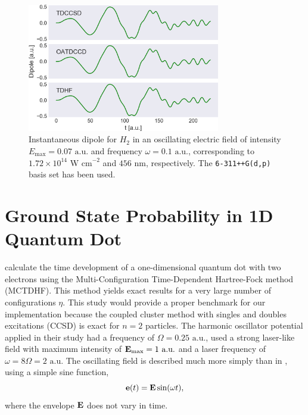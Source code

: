 \begin{figure}
    \centering
    \includegraphics[width=0.75\textwidth]{results/figures/li_compare.png}
    \caption{Instantaneous dipole for $H_2$ in an oscillating electric field
        of intensity $E_\text{max} = 0.07 \text{ a.u.}$ 
        and frequency $\omega=0.1 \text{ a.u.}$, corresponding to
        $1.72\times10^14 \text{ W cm}^{-2}$ and $456\text{ nm}$, respectively.
        The \lstinline{6-311++G(d,p)}
        basis set has been used.
    }
    \label{fig:li_compare}
\end{figure}


\section{Ground State Probability in 1D Quantum Dot}

\citeauthor{Zanghellini04} \cite{Zanghellini04} calculate the time development of a 
one-dimensional quantum dot with two electrons using the Multi-Configuration 
Time-Dependent Hartree-Fock method (MCTDHF). This method yields exact results for 
a very large number of configurations $\eta$. This study would provide a 
proper benchmark for our implementation because the coupled cluster method with singles and 
doubles excitations (CCSD) is exact for $n=2$ particles. 
The harmonic oscillator potential applied in
their study had a frequency of $\Omega=0.25 \text{ a.u.}$, used a strong laser-like field with 
maximum intensity of $\vb{E}_\text{max} = 1 \text{ a.u.}$ and a laser frequency of
$\omega = 8 \Omega = 2 \text{ a.u.}$
The oscillating field is described much more simply than in
\citeauthor{li2005time} \cite{li2005time}, using a simple sine function,
\begin{equation}
    \vb{e}(t) = \vb{E}\sin(\omega t),
\end{equation}
where the envelope $\vb{E}$ does not vary in time.

